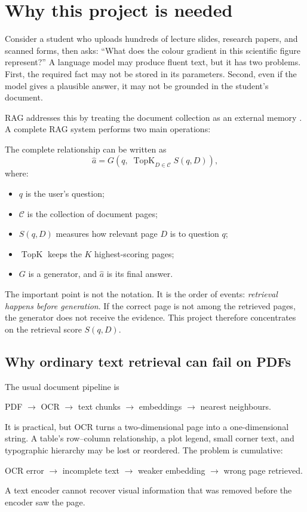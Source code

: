 \documentclass[11pt,a4paper]{article}
\begin{document}
\section{Why this project is needed}

Consider a student who uploads hundreds of lecture slides, research papers, and scanned forms, then asks: ``What does the colour gradient in this scientific figure represent?'' A language model may produce fluent text, but it has two problems. First, the required fact may not be stored in its parameters. Second, even if the model gives a plausible answer, it may not be grounded in the student's document.

RAG addresses this by treating the document collection as an external memory \cite{lewis2020rag}. A complete RAG system performs two main operations:
\begin{center}
\end{center}
The complete relationship can be written as
\begin{equation}
\hat{a}=G\!\left(q,\;\operatorname{TopK}_{D\in\mathcal{C}} S(q,D)\right),
\label{eq:rag}
\end{equation}
where:
\begin{itemize}
  \item $q$ is the user's question;
  \item $\mathcal{C}$ is the collection of document pages;
  \item $S(q,D)$ measures how relevant page $D$ is to question $q$;
  \item $\operatorname{TopK}$ keeps the $K$ highest-scoring pages;
  \item $G$ is a generator, and $\hat a$ is its final answer.
\end{itemize}

The important point is not the notation. It is the order of events: \emph{retrieval happens before generation}. If the correct page is not among the retrieved pages, the generator does not receive the evidence. This project therefore concentrates on the retrieval score $S(q,D)$.

\subsection{Why ordinary text retrieval can fail on PDFs}

The usual document pipeline is
\begin{center}
PDF $\rightarrow$ OCR $\rightarrow$ text chunks $\rightarrow$ embeddings $\rightarrow$ nearest neighbours.
\end{center}
It is practical, but OCR turns a two-dimensional page into a one-dimensional string. A table's row--column relationship, a plot legend, small corner text, and typographic hierarchy may be lost or reordered. The problem is cumulative:
\begin{center}
OCR error $\rightarrow$ incomplete text $\rightarrow$ weaker embedding $\rightarrow$ wrong page retrieved.
\end{center}
A text encoder cannot recover visual information that was removed before the encoder saw the page.
\end{document}
